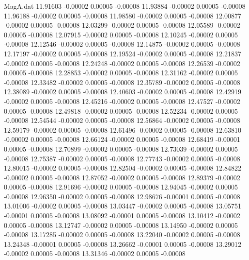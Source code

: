 \begin{filecontents}{MagA.dat}
  11.91603   -0.00002    0.00005   -0.00008
  11.93884   -0.00002    0.00005   -0.00008
  11.96188   -0.00002    0.00005   -0.00008
  11.98580   -0.00002    0.00005   -0.00008
  12.00877   -0.00002    0.00005   -0.00008
  12.03299   -0.00002    0.00005   -0.00008
  12.05589   -0.00002    0.00005   -0.00008
  12.07915   -0.00002    0.00005   -0.00008
  12.10245   -0.00002    0.00005   -0.00008
  12.12546   -0.00002    0.00005   -0.00008
  12.14875   -0.00002    0.00005   -0.00008
  12.17197   -0.00002    0.00005   -0.00008
  12.19524   -0.00002    0.00005   -0.00008
  12.21837   -0.00002    0.00005   -0.00008
  12.24248   -0.00002    0.00005   -0.00008
  12.26539   -0.00002    0.00005   -0.00008
  12.28853   -0.00002    0.00005   -0.00008
  12.31162   -0.00002    0.00005   -0.00008
  12.33482   -0.00002    0.00005   -0.00008
  12.35789   -0.00002    0.00005   -0.00008
  12.38089   -0.00002    0.00005   -0.00008
  12.40603   -0.00002    0.00005   -0.00008
  12.42919   -0.00002    0.00005   -0.00008
  12.45216   -0.00002    0.00005   -0.00008
  12.47527   -0.00002    0.00005   -0.00008
  12.49818   -0.00002    0.00005   -0.00008
  12.52234   -0.00002    0.00005   -0.00008
  12.54544   -0.00002    0.00005   -0.00008
  12.56864   -0.00002    0.00005   -0.00008
  12.59179   -0.00002    0.00005   -0.00008
  12.61496   -0.00002    0.00005   -0.00008
  12.63810   -0.00002    0.00005   -0.00008
  12.66124   -0.00002    0.00005   -0.00008
  12.68419   -0.00001    0.00005   -0.00008
  12.70899   -0.00002    0.00005   -0.00008
  12.73039   -0.00002    0.00005   -0.00008
  12.75387   -0.00002    0.00005   -0.00008
  12.77743   -0.00002    0.00005   -0.00008
  12.80015   -0.00002    0.00005   -0.00008
  12.82504   -0.00002    0.00005   -0.00008
  12.84822   -0.00002    0.00005   -0.00008
  12.87052   -0.00002    0.00005   -0.00008
  12.89379   -0.00002    0.00005   -0.00008
  12.91696   -0.00002    0.00005   -0.00008
  12.94045   -0.00002    0.00005   -0.00008
  12.96350   -0.00002    0.00005   -0.00008
  12.98676   -0.00001    0.00005   -0.00008
  13.01006   -0.00002    0.00005   -0.00008
  13.03447   -0.00002    0.00005   -0.00008
  13.05751   -0.00001    0.00005   -0.00008
  13.08092   -0.00001    0.00005   -0.00008
  13.10412   -0.00002    0.00005   -0.00008
  13.12747   -0.00002    0.00005   -0.00008
  13.14950   -0.00002    0.00005   -0.00008
  13.17285   -0.00002    0.00005   -0.00008
  13.22040   -0.00002    0.00005   -0.00008
  13.24348   -0.00001    0.00005   -0.00008
  13.26662   -0.00001    0.00005   -0.00008
  13.29012   -0.00002    0.00005   -0.00008
  13.31346   -0.00002    0.00005   -0.00008

\end{filecontents}
